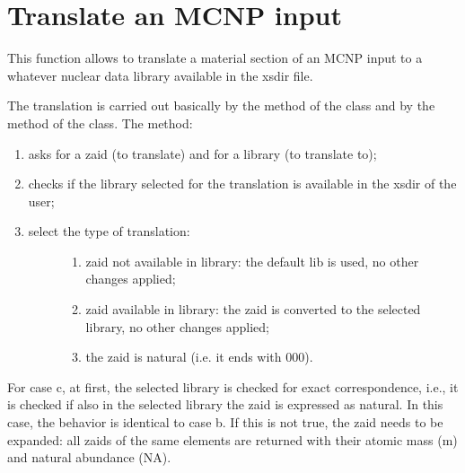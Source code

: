 \documentclass[letterpaper,10pt,english]{sphinxmanual}
\begin{document}


{\hyperref[\detokenize{usage/configuration:mainconfig}]{}}




\section{Translate an MCNP input}
\label{\detokenize{usage/utilities:translate-an-mcnp-input}}

This function allows to translate a material section of an MCNP input to
a whatever nuclear data library available in the xsdir file.

The translation is carried out basically by the  method of the
 class and by the  method of the  class.
The  method:
\begin{enumerate}
%
\item {} 
asks for a zaid (to translate) and for a library (to translate to);

\item {} 
checks if the library selected for the translation is available in the xsdir of
the user;

\item {} \begin{description}
\item[{select the type of translation:}] \leavevmode\begin{enumerate}
%
\item {} 
zaid not available in library: the default lib is used, no other changes
applied;

\item {} 
zaid available in library: the zaid is converted to the selected library,
no other changes applied;

\item {} 
the zaid is natural (i.e. it ends with 000).

\end{enumerate}

\end{description}

\end{enumerate}

For case c, at first, the selected library is checked for exact correspondence,
i.e., it is checked if also in the selected library the zaid is expressed as natural.
In this case, the behavior is identical to case b. If this is not true, the zaid needs
to be expanded: all zaids of the same elements are returned with their atomic mass (m)
and natural abundance (NA).
\end{document}
